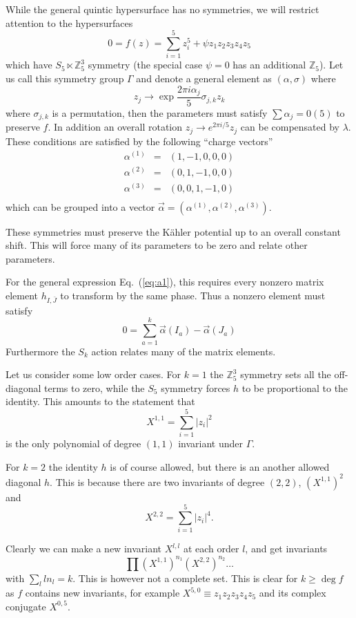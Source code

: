 \documentclass[12pt]{article}
\def\IZ{\mathbb{Z}}
\newcommand{\eq}[1]{Eq.~(\ref{eq:#1})}
\newcommand{\be}{\begin{equation}}
\newcommand{\ee}{\end{equation}}
\newcommand{\bea}{\begin{eqnarray}}
\newcommand{\eea}{\end{eqnarray}}
\def\bJ{{\bar{J}}}
\begin{document}
{{{{While the general quintic hypersurface has no symmetries, we will restrict attention to the
hypersurfaces
\be \label{eq:fermat}
0 = f(z) = \sum_{i=1}^5 z_i^5 + \psi z_1z_2z_3z_4z_5
\ee
which have $S_5 \ltimes \IZ_5^3$ symmetry (the special case $\psi=0$ has an additional $\IZ_5$).
Let us call this symmetry group $\Gamma$ and denote a general  element as $(\alpha,\sigma)$ where
\be
z_j \rightarrow \exp \frac{2\pi i\alpha_j}{5} \sigma_{j,k} z_k 
\ee
where $\sigma_{j,k}$ is a permutation, then the parameters must satisfy $\sum \alpha_j=0 (5)$ to
preserve $f$.  In addition an overall rotation $z_j\rightarrow e^{2\pi i/5}z_j$ can be compensated
by $\lambda$.   These conditions are satisfied by the following ``charge vectors'' 
\bea
\alpha^{(1)} &=& ( 1, -1, 0, 0, 0 ) \\
\alpha^{(2)} &=& ( 0, 1, -1, 0, 0 ) \\
\alpha^{(3)} &=& ( 0, 0, 1, -1, 0 ) \\
\eea
which can be grouped into a vector $\vec \alpha=(\alpha^{(1)},\alpha^{(2)},\alpha^{(3)})$.

These symmetries must preserve the K\"ahler potential up to an overall constant shift.
This will force many of its parameters to be zero and relate other parameters.

For the general expression  \eq{a1}, this requires every nonzero matrix element $h_{I,\bJ}$ to
transform by the same phase.  Thus a nonzero element must satisfy
\be
0 = \sum_{a=1}^k {\vec \alpha}( I_a ) - {\vec \alpha}( J_a ) 
\ee
Furthermore the $S_k$ action relates many of the matrix elements.

Let us consider some low order cases.  For $k=1$ the $\IZ_5^3$ symmetry sets all the off-diagonal
terms to zero, while the $S_5$ symmetry forces $h$ to be proportional to the identity.
This amounts to the statement that 
\be
X^{1,1} = \sum_{i=1}^5 |z_i|^2
\ee
is the only polynomial of degree $(1,1)$ invariant under $\Gamma$.

For $k=2$ the identity $h$ is of course allowed, but there is an another allowed diagonal $h$.
This is because there are two invariants of degree $(2,2)$, $(X^{1,1})^2$ and
\be
X^{2,2} = \sum_{i=1}^5 |z_i|^4 .
\ee

Clearly we can make a new invariant $X^{l,l}$ at each order $l$, and get invariants 
\be
\prod (X^{1,1})^{n_1}  (X^{2,2})^{n_2} \ldots
\ee
with $\sum_l l n_l = k$.  This is however not a complete set.  This is clear for $k\ge \deg f$
as $f$ contains new invariants, for example $X^{5,0}\equiv z_1z_2z_3z_4z_5$ and its
complex conjugate $X^{0,5}$.

}}}}
\end{document}
